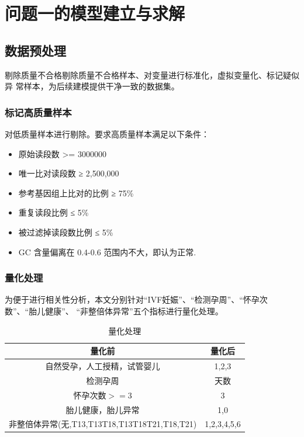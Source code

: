 \documentclass[withoutpreface,notoc]{cumcmthesis}
\begin{document}
	
	\section{问题一的模型建立与求解}

	\subsection{数据预处理}
	剔除质量不合格剔除质量不合格样本、对变量进行标准化，虚拟变量化、标记疑似异
	常样本，为后续建模提供干净一致的数据集。

	\subsubsection{标记高质量样本}

	对低质量样本进行剔除。要求高质量样本满足以下条件：
	\begin{itemize}
		\item 原始读段数 >= 3000000
		\item 唯一比对读段数 ≥ 2,500,000
		\item 参考基因组上比对的比例 ≥ 75\%
		\item 重复读段比例 ≤ 5\%
		\item 被过滤掉读段数比例 ≤ 5\%
		\item GC 含量偏离在 0.4-0.6 范围内不大，即认为正常.
	\end{itemize}

	\subsubsection{量化处理}
	为便于进行相关性分析，本文分别针对“IVF妊娠”、“检测孕周”、“怀孕次数”、“胎儿健康”、
	“非整倍体异常”五个指标进行量化处理。


	\begin{table}[H]
		\centering
		\caption{量化处理}
		\label{量化处理}
		\begin{tabularx}{\textwidth}{cc}
			\toprule
			\textbf{量化前} & \textbf{量化后} \\
			\midrule
			自然受孕，人工授精，试管婴儿     & 1,2,3 \\
			检测孕周      & 天数 \\
			怀孕次数$>=3$      & 3 \\
			胎儿健康，胎儿异常     & 1,0 \\
			非整倍体异常(无,T13,T13T18,T13T18T21,T18,T21) & 1,2,3,4,5,6 \\
			\bottomrule
		\end{tabularx}
	\end{table}
\end{document}
